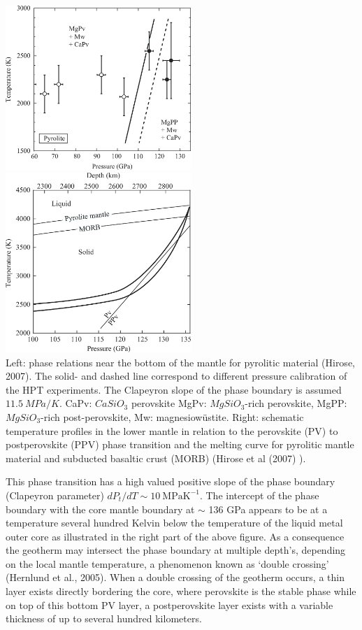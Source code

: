 \begin{center}
\includegraphics[width=7cm]{images/gravity/hirose_fig1}
\includegraphics[width=7cm]{images/gravity/hirose_fig5}\\
{\captionfont
Left: phase relations near the bottom of the mantle for 
          pyrolitic material (Hirose, 2007).
          The solid- and dashed line correspond to different
          pressure calibration of the HPT experiments. 
          The Clapeyron slope of the phase boundary is 
          assumed $11.5 ~MPa/K$. 
          CaPv: $CaSiO_3$ perovskite
          MgPv: $MgSiO_3$-rich perovskite,
          MgPP: $MgSiO_3$-rich post-perovskite,
          Mw: magnesiow\"{u}stite.
       Right: schematic temperature profiles in the lower mantle 
       in relation to
       the perovskite (PV) to postperovskite (PPV) phase transition
       and the melting curve for pyrolitic mantle material and 
       subducted basaltic crust (MORB) (Hirose et al (2007) \cite{hibl07}).
}
\end{center}


This phase transition has a high valued
positive slope of the phase boundary (Clapeyron parameter) 
$dP_t/dT \sim 10 ~ \mathrm{MPa K^{-1}}$. 
The intercept of the phase boundary with the core mantle boundary
at $\sim$ 136 GPa appears to be at a temperature several hundred Kelvin
below the temperature of the liquid metal outer core as illustrated in
the right part of the above figure.
As a consequence the geotherm may intersect the phase boundary 
at multiple depth's,
depending on the local mantle temperature, 
a phenomenon known as `double crossing' (Hernlund et al., 2005).
When a double crossing of the geotherm occurs, 
a thin layer exists directly bordering the core, where perovskite is the stable
phase while on top of this bottom PV layer, a postperovskite layer 
exists with a variable thickness of up to several hundred
kilometers.  

